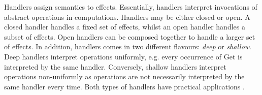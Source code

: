 \documentclass[preprint,10pt,numbers]{sigplanconf}
\begin{document}


Handlers assign semantics to effects. Essentially, handlers interpret invocations of abstract operations in computations. Handlers may be either closed or open. A closed handler handles a fixed set of effects, whilst an open handler handles a subset of effects. Open handlers can be composed together to handle a larger set of effects. In addition, handlers comes in two different flavours: \emph{deep} or \emph{shallow}. Deep handlers interpret operations uniformly, e.g. every occurrence of Get is interpreted by the same handler. Conversely, shallow handlers interpret operations non-uniformly as operations are not necessarily interpreted by the same handler every time. Both types of handlers have practical applications \cite{Kammar2013}.
\end{document}
